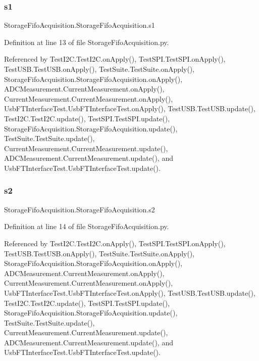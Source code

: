 \subsubsection{\texorpdfstring{s1}{s1}}
{\footnotesize\ttfamily Storage\+Fifo\+Acquisition.\+Storage\+Fifo\+Acquisition.\+s1}



Definition at line 13 of file Storage\+Fifo\+Acquisition.\+py.



Referenced by Test\+I2\+C.\+Test\+I2\+C.\+on\+Apply(), Test\+S\+P\+I.\+Test\+S\+P\+I.\+on\+Apply(), Test\+U\+S\+B.\+Test\+U\+S\+B.\+on\+Apply(), Test\+Suite.\+Test\+Suite.\+on\+Apply(), Storage\+Fifo\+Acquisition.\+Storage\+Fifo\+Acquisition.\+on\+Apply(), A\+D\+C\+Measurement.\+Current\+Measurement.\+on\+Apply(), Current\+Measurement.\+Current\+Measurement.\+on\+Apply(), Usb\+F\+T\+Interface\+Test.\+Usb\+F\+T\+Interface\+Test.\+on\+Apply(), Test\+U\+S\+B.\+Test\+U\+S\+B.\+update(), Test\+I2\+C.\+Test\+I2\+C.\+update(), Test\+S\+P\+I.\+Test\+S\+P\+I.\+update(), Storage\+Fifo\+Acquisition.\+Storage\+Fifo\+Acquisition.\+update(), Test\+Suite.\+Test\+Suite.\+update(), Current\+Measurement.\+Current\+Measurement.\+update(), A\+D\+C\+Measurement.\+Current\+Measurement.\+update(), and Usb\+F\+T\+Interface\+Test.\+Usb\+F\+T\+Interface\+Test.\+update().

\mbox{\label{classStorageFifoAcquisition_1_1StorageFifoAcquisition_af2adbf0c0e1b8cda0a0ef86d106fc1ed}} 
\subsubsection{\texorpdfstring{s2}{s2}}
{\footnotesize\ttfamily Storage\+Fifo\+Acquisition.\+Storage\+Fifo\+Acquisition.\+s2}



Definition at line 14 of file Storage\+Fifo\+Acquisition.\+py.



Referenced by Test\+I2\+C.\+Test\+I2\+C.\+on\+Apply(), Test\+S\+P\+I.\+Test\+S\+P\+I.\+on\+Apply(), Test\+U\+S\+B.\+Test\+U\+S\+B.\+on\+Apply(), Test\+Suite.\+Test\+Suite.\+on\+Apply(), Storage\+Fifo\+Acquisition.\+Storage\+Fifo\+Acquisition.\+on\+Apply(), A\+D\+C\+Measurement.\+Current\+Measurement.\+on\+Apply(), Current\+Measurement.\+Current\+Measurement.\+on\+Apply(), Usb\+F\+T\+Interface\+Test.\+Usb\+F\+T\+Interface\+Test.\+on\+Apply(), Test\+U\+S\+B.\+Test\+U\+S\+B.\+update(), Test\+I2\+C.\+Test\+I2\+C.\+update(), Test\+S\+P\+I.\+Test\+S\+P\+I.\+update(), Storage\+Fifo\+Acquisition.\+Storage\+Fifo\+Acquisition.\+update(), Test\+Suite.\+Test\+Suite.\+update(), Current\+Measurement.\+Current\+Measurement.\+update(), A\+D\+C\+Measurement.\+Current\+Measurement.\+update(), and Usb\+F\+T\+Interface\+Test.\+Usb\+F\+T\+Interface\+Test.\+update().

